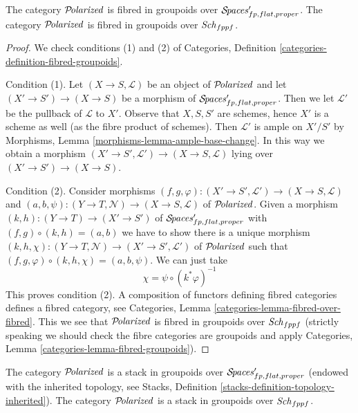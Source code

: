 \begin{lemma}
\label{lemma-polarized-fibred-in-groupoids}
The category $\mathcal{P}\!\mathit{olarized}$ is fibred in groupoids over
$\mathcal{S}\!\mathit{paces}'_{fp, flat, proper}$.
The category $\mathcal{P}\!\mathit{olarized}$ is fibred in groupoids over $\mathit{Sch}_{fppf}$.
\end{lemma}

\begin{proof}
We check conditions (1) and (2) of
Categories, Definition \ref{categories-definition-fibred-groupoids}.

\medskip\noindent
Condition (1). Let $(X \to S, \mathcal{L})$ be an object of
$\mathcal{P}\!\mathit{olarized}$ and let $(X' \to S') \to (X \to S)$
be a morphism of $\mathcal{S}\!\mathit{paces}'_{fp, flat, proper}$. Then we
let $\mathcal{L}'$ be the pullback of $\mathcal{L}$ to $X'$.
Observe that $X, S, S'$ are schemes, hence $X'$ is a scheme
as well (as the fibre product of schemes). Then
$\mathcal{L}'$ is ample on $X'/S'$ by
Morphisms, Lemma \ref{morphisms-lemma-ample-base-change}.
In this way we obtain a morphism
$(X' \to S', \mathcal{L}') \to (X \to S, \mathcal{L})$
lying over $(X' \to S') \to (X \to S)$.

\medskip\noindent
Condition (2). Consider morphisms
$(f, g, \varphi) : (X' \to S', \mathcal{L}') \to (X \to S, \mathcal{L})$ and
$(a, b, \psi) : (Y \to T, \mathcal{N}) \to (X \to S, \mathcal{L})$
of $\mathcal{P}\!\mathit{olarized}$. Given a morphism $(k, h) : (Y \to T) \to (X' \to S')$
of $\mathcal{S}\!\mathit{paces}'_{fp, flat, proper}$
with $(f, g) \circ (k, h) = (a, b)$ we have to show
there is a unique morphism
$(k, h, \chi) : (Y \to T, \mathcal{N}) \to (X' \to S', \mathcal{L}')$
of $\mathcal{P}\!\mathit{olarized}$ such that
$(f, g, \varphi) \circ (k, h, \chi) = (a, b, \psi)$.
We can just take
$$
\chi = \psi \circ (k^*\varphi)^{-1}
$$
This proves condition (2). A composition of functors defining
fibred categories defines a fibred category, see
Categories, Lemma \ref{categories-lemma-fibred-over-fibred}.
This we see that $\mathcal{P}\!\mathit{olarized}$ is fibred in groupoids over
$\mathit{Sch}_{fppf}$ (strictly speaking we should check the fibre
categories are groupoids and apply
Categories, Lemma \ref{categories-lemma-fibred-groupoids}).
\end{proof}

\begin{lemma}
\label{lemma-polarized-stack}
The category $\mathcal{P}\!\mathit{olarized}$ is a stack in groupoids over
$\mathcal{S}\!\mathit{paces}'_{fp, flat, proper}$ (endowed with the inherited topology,
see Stacks, Definition \ref{stacks-definition-topology-inherited}).
The category $\mathcal{P}\!\mathit{olarized}$ is a stack in groupoids over $\mathit{Sch}_{fppf}$.
\end{lemma}

